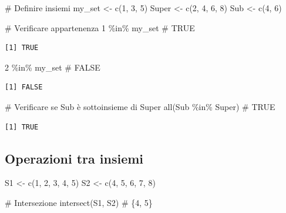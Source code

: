 \documentclass[
  italian,
  letterpaper,
  a4paper,
  11pt,
  open=any]{scrbook}
\newenvironment{Shaded}{\begin{snugshade}}{\end{snugshade}}
\newcommand{\CommentTok}[1]{\textcolor[rgb]{0.37,0.37,0.37}{#1}}
\newcommand{\DecValTok}[1]{\textcolor[rgb]{0.68,0.00,0.00}{#1}}
\newcommand{\FunctionTok}[1]{\textcolor[rgb]{0.28,0.35,0.67}{#1}}
\newcommand{\NormalTok}[1]{\textcolor[rgb]{0.00,0.23,0.31}{#1}}
\newcommand{\OtherTok}[1]{\textcolor[rgb]{0.00,0.23,0.31}{#1}}
\newcommand{\SpecialCharTok}[1]{\textcolor[rgb]{0.37,0.37,0.37}{#1}}
\theoremstyle{plain}
\theoremstyle{definition}
\theoremstyle{definition}
\theoremstyle{remark}
\begin{document}
\begin{Shaded}
\begin{Highlighting}[]
\CommentTok{\# Definire insiemi}
\NormalTok{my\_set }\OtherTok{\textless{}{-}} \FunctionTok{c}\NormalTok{(}\DecValTok{1}\NormalTok{, }\DecValTok{3}\NormalTok{, }\DecValTok{5}\NormalTok{)}
\NormalTok{Super }\OtherTok{\textless{}{-}} \FunctionTok{c}\NormalTok{(}\DecValTok{2}\NormalTok{, }\DecValTok{4}\NormalTok{, }\DecValTok{6}\NormalTok{, }\DecValTok{8}\NormalTok{)}
\NormalTok{Sub }\OtherTok{\textless{}{-}} \FunctionTok{c}\NormalTok{(}\DecValTok{4}\NormalTok{, }\DecValTok{6}\NormalTok{)}

\CommentTok{\# Verificare appartenenza}
\DecValTok{1} \SpecialCharTok{\%in\%}\NormalTok{ my\_set        }\CommentTok{\# TRUE}
\end{Highlighting}
\end{Shaded}

\begin{verbatim}
[1] TRUE
\end{verbatim}

\begin{Shaded}
\begin{Highlighting}[]
\DecValTok{2} \SpecialCharTok{\%in\%}\NormalTok{ my\_set        }\CommentTok{\# FALSE}
\end{Highlighting}
\end{Shaded}

\begin{verbatim}
[1] FALSE
\end{verbatim}

\begin{Shaded}
\begin{Highlighting}[]
\CommentTok{\# Verificare se Sub è sottoinsieme di Super}
\FunctionTok{all}\NormalTok{(Sub }\SpecialCharTok{\%in\%}\NormalTok{ Super)  }\CommentTok{\# TRUE}
\end{Highlighting}
\end{Shaded}

\begin{verbatim}
[1] TRUE
\end{verbatim}

\subsection{Operazioni tra insiemi}\label{operazioni-tra-insiemi-1}

\begin{Shaded}
\begin{Highlighting}[]
\NormalTok{S1 }\OtherTok{\textless{}{-}} \FunctionTok{c}\NormalTok{(}\DecValTok{1}\NormalTok{, }\DecValTok{2}\NormalTok{, }\DecValTok{3}\NormalTok{, }\DecValTok{4}\NormalTok{, }\DecValTok{5}\NormalTok{)}
\NormalTok{S2 }\OtherTok{\textless{}{-}} \FunctionTok{c}\NormalTok{(}\DecValTok{4}\NormalTok{, }\DecValTok{5}\NormalTok{, }\DecValTok{6}\NormalTok{, }\DecValTok{7}\NormalTok{, }\DecValTok{8}\NormalTok{)}

\CommentTok{\# Intersezione}
\FunctionTok{intersect}\NormalTok{(S1, S2)           }\CommentTok{\# \{4, 5\}}
\end{Highlighting}
\end{Shaded}
\end{document}
